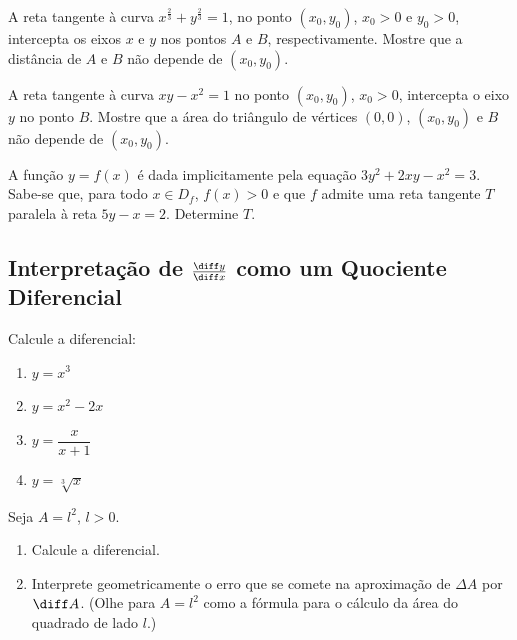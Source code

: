 \begin{exercicio}[9]
A reta tangente à curva $x^{\frac{2}{3}} + y^{\frac{2}{3}} = 1$, no ponto $(x_0, y_0)$, $x_0 > 0$ e $y_0 > 0$, intercepta os eixos $x$ e $y$ nos pontos $A$ e $B$, respectivamente. Mostre que a distância de $A$ e $B$ não depende de $(x_0, y_0)$.
\end{exercicio}

\begin{exercicio}[10]
A reta tangente à curva $xy - x^2 = 1$ no ponto $(x_0, y_0)$, $x_0 > 0$, intercepta o eixo $y$ no ponto $B$. Mostre que a área do triângulo de vértices $(0,0)$, $(x_0, y_0)$ e $B$ não depende de $(x_0, y_0)$.
\end{exercicio}

\begin{exercicio}[11]
A função $y = f(x)$ é dada implicitamente pela equação $3y^2 + 2xy - x^2 = 3$. Sabe-se que, para todo $x \in D_f$, $f(x) > 0$ e que $f$ admite uma reta tangente $T$ paralela à reta $5y - x = 2$. Determine $T$.
\end{exercicio}

\clearpage

\subsection{Interpretação de $\frac{\diff y}{\diff x}$ como um Quociente Diferencial}

\begin{exercicio}[1]
Calcule a diferencial:
\begin{enumerate}[label=\alph*)]
    \item $y = x^3$
    \item $y = x^2 - 2x$
    \item $y = \dfrac{x}{x + 1}$
    \item $y = \sqrt[3]{x}$
\end{enumerate}
\end{exercicio}

\begin{exercicio}[2]
Seja $A = l^2$, $l > 0$.
\begin{enumerate}[label=\alph*)]
    \item Calcule a diferencial.
    \item Interprete geometricamente o erro que se comete na aproximação de $\Delta A$ por $\diff A$. (Olhe para $A = l^2$ como a fórmula para o cálculo da área do quadrado de lado $l$.)
\end{enumerate}
\end{exercicio}

